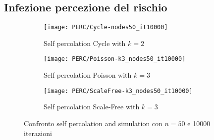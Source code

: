\subsection{Infezione percezione del rischio}\label{subsec:app-infezione-con-la-percezione-del-rischio}
    \begin{figure}[H]
        \begin{minipage}{\linewidth}
            \centering
            \begin{minipage}{0.45\linewidth}
                \begin{figure}
                    \texttt{[image: PERC/Cycle-nodes50\_it10000]}\caption{Self percolation Cycle with $k=2$}
                    \label{fig:perc_cycle_nodes_50}
                \end{figure}
            \end{minipage}
            \hspace{0.05\linewidth}
            \begin{minipage}{0.45\linewidth}
                \begin{figure}
                    \texttt{[image: PERC/Poisson-k3\_nodes50\_it10000]}\caption{Self percolation Poisson with $k=3$}
                    \label{fig:perc_poisson_k_3_nodes_50}
                \end{figure}
            \end{minipage}
            \begin{minipage}{0.45\linewidth}
                \begin{figure}
                    \texttt{[image: PERC/ScaleFree-k3\_nodes50\_it10000]}\caption{Self percolation Scale-Free with $k=3$}
                    \label{fig:perc_scale_free_k_3_nodes_50}
                \end{figure}
            \end{minipage}
            \caption{Confronto self percolation and simulation con $n=50$ e 10000 iterazioni}
        \end{minipage}
    \end{figure}

